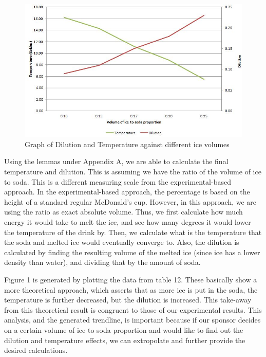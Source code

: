 \documentclass[oneside,12pt]{report}
\begin{document}
\begin{figure}
	\centering
	\caption{Graph of Dilution and Temperature against different ice volumes}
	\includegraphics[width=\textwidth]{extra/Graph.jpg}
\end{figure}

\vspace{12pt}
Using the lemmas under Appendix A, we are able to calculate the final temperature and dilution. This is assuming we have the ratio of the volume of ice to soda. This is a different measuring scale from the experimental-based approach. In the experimental-based approach, the percentage is based on the height of a standard regular McDonald's cup. However, in this approach, we are using the ratio as exact absolute volume. Thus, we first calculate how much energy it would take to melt the ice, and see how many degrees it would lower the temperature of the drink by. Then, we calculate what is the temperature that the soda and melted ice would eventually converge to. Also, the dilution is calculated by finding the resulting volume of the melted ice (since ice has a lower density than water), and dividing that by the amount of soda.

Figure 1 is generated by plotting the data from table 12. These basically show a more theoretical approach, which asserts that as more ice is put in the soda, the temperature is further decreased, but the dilution is increased. This take-away from this theoretical result is congruent to those of our experimental results.  This analysis, and the generated trendline, is important because if our sponsor decides on a certain volume of ice to soda proportion and would like to find out the dilution and temperature effects, we can extropolate and further provide the desired calculations. 
\end{document}
